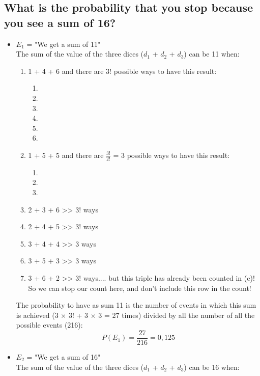 \documentclass[oneside]{article}			%
\begin{document}
	\subsection{What is the probability that you stop because you see a sum of 16?}
	\begin{itemize}
		\item $E_1$ = "We get a sum of 11"
			\\
			The sum of the value of the three dices ($d_1$ + $d_2$ + $d_3$) can be 11 when:
			\begin{enumerate}[label=(\alph*)]
				\item 1 + 4 + 6 and there are 3! possible ways to have this result:
					\begin{enumerate}[label=\arabic*.]
					\item <1, 2, 6>
					\item <1, 6, 2>
					\item <2, 1, 6>
					\item <2, 6, 1>
					\item <6, 1, 2>
					\item <6, 2, 1>
					\end{enumerate}
				\item 1 + 5 + 5 and there are $\frac{3!}{2!}$ = 3 possible ways to have this result:
					\begin{enumerate}[label=\arabic*.]
						\item <1, 5, 5>
						\item <5, 1, 5>
						\item <1, 5, 5>
					\end{enumerate}
				\item 2 + 3 + 6 >> 3! ways
				\item 2 + 4 + 5 >> 3! ways
				\item 3 + 4 + 4 >> 3 ways
				\item 3 + 5 + 3 >> 3 ways
				\item 3 + 6 + 2 >> 3! ways.... but this triple has already been counted in (c)! So we can stop our count here, and don't include this row in the count!
			\end{enumerate}
			The probability to have as sum 11 is the number of events in which this sum is achieved (3 $\times$ 3! + 3 $\times$ 3 = 27 times) divided by all the number of all the possible events (216):
			\[P(E_1) = \frac{27}{216} = 0,125 \]
		\item $E_2$ = "We get a sum of 16"
			\\
			The sum of the value of the three dices ($d_1$ + $d_2$ + $d_3$) can be 16 when:

\end{itemize}
\end{document}

